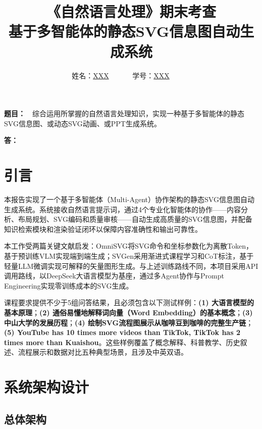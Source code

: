 \documentclass[11pt,a4paper]{article}
\begin{document}
\title{
{\heiti《自然语言处理》期末考查\\[6pt]
基于多智能体的静态SVG信息图自动生成系统}
}
\date{}
\author{
姓名：\underline{XXX}~~~~~~
学号：\underline{XXX}~~~~~~}

\maketitle

\noindent
{\bf 题目：}~~综合运用所掌握的自然语言处理知识，实现一种基于多智能体的静态SVG信息图、或动态SVG动画、或PPT生成系统。

\vspace{3pt}
\noindent
{\bf 答：}

\section{引言}

本报告实现了一个基于多智能体（Multi-Agent）协作架构的静态SVG信息图自动生成系统。系统接收自然语言提示词，通过4个专业化智能体的协作——内容分析、布局规划、SVG编码和质量审核——自动生成高质量的SVG信息图，并配备知识检索模块和渲染验证闭环以保障内容准确性和输出可靠性。

本工作受两篇关键文献启发：OmniSVG\cite{omnisvg}将SVG命令和坐标参数化为离散Token，基于预训练VLM实现端到端生成；SVGen\cite{svgen}采用渐进式课程学习和CoT标注，基于轻量LLM微调实现可解释的矢量图形生成。与上述训练路线不同，本项目采用API调用路线，以DeepSeek大语言模型\cite{deepseek}为基座，通过多Agent协作与Prompt Engineering实现零训练成本的SVG生成。

课程要求提供不少于5组问答结果，且必须包含以下测试样例：\textbf{(1) 大语言模型的基本原理}；\textbf{(2) 通俗易懂地解释词向量（Word Embedding）的基本概念}；\textbf{(3) 中山大学的发展历程}；\textbf{(4) 绘制SVG流程图展示从咖啡豆到咖啡的完整生产链}；\textbf{(5) YouTube has 10 times more videos than TikTok, TikTok has 2 times more than Kuaishou}。这些样例覆盖了概念解释、科普教学、历史叙述、流程展示和数据对比五种典型场景，且涉及中英双语。

\section{系统架构设计}

\subsection{总体架构}
\end{document}
